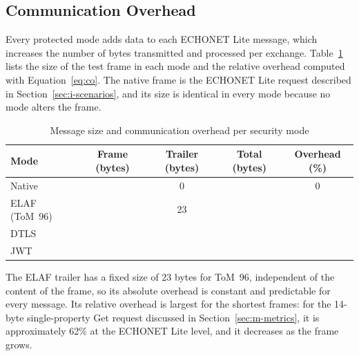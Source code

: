 \subsection{Communication Overhead}
\label{sec:r-overhead}

Every protected mode adds data to each ECHONET Lite message, which increases the number of bytes transmitted and processed per exchange. Table~\ref{tab:r-size} lists the size of the test frame in each mode and the relative overhead computed with Equation~\ref{eq:co}. The native frame is the ECHONET Lite request described in Section~\ref{sec:i-scenarios}, and its size is identical in every mode because no mode alters the frame.

\begin{table}[htbp]
  \centering
  \caption{Message size and communication overhead per security mode}
  \label{tab:r-size}
  \renewcommand{\arraystretch}{1.2}
  \begin{tabularx}{\textwidth}{@{}X c c c c@{}}
    \toprule
    \textbf{Mode} & \textbf{Frame (bytes)} & \textbf{Trailer (bytes)} & \textbf{Total (bytes)} & \textbf{Overhead (\%)} \\
    \midrule
    Native        & \tbd{}                 & 0                        & \tbd{}                 & 0                      \\
    ELAF (ToM~96) & \tbd{}                 & 23                       & \tbd{}                 & \tbd{}                 \\
    DTLS          & \tbd{}                 & \tbd{}                   & \tbd{}                 & \tbd{}                 \\
    JWT           & \tbd{}                 & \tbd{}                   & \tbd{}                 & \tbd{}                 \\
    \bottomrule
  \end{tabularx}
\end{table}

The ELAF trailer has a fixed size of 23 bytes for ToM~96, independent of the content of the frame, so its absolute overhead is constant and predictable for every message. Its relative overhead is largest for the shortest frames: for the 14-byte single-property Get request discussed in Section~\ref{sec:m-metrics}, it is approximately 62\% at the ECHONET Lite level, and it decreases as the frame grows.


